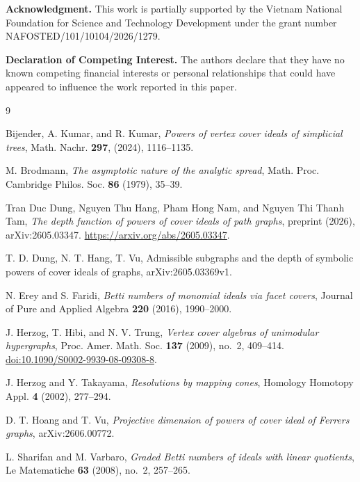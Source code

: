 \documentclass[12pt]{amsart}
\theoremstyle{definition}
\theoremstyle{remark}
\numberwithin{equation}{section}
\begin{document}
\noindent\textbf{Acknowledgment.} This work is partially supported by the Vietnam National Foundation for Science and Technology Development under the grant number NAFOSTED/101/10104/2026/1279.

\noindent\textbf{Declaration of Competing Interest.} The authors declare that they have no known competing financial interests or personal relationships that could have appeared to influence the work reported in this paper.

\begin{thebibliography}{9}

 Bijender, A. Kumar, and R. Kumar, {\it Powers of vertex cover ideals of simplicial trees}, Math. Nachr. {\bf 297}, (2024), 1116--1135.


 M. Brodmann, {\em The asymptotic nature of the analytic spread}, Math. Proc. Cambridge Philos. Soc. {\bf 86} (1979), 35--39.

Tran Duc Dung, Nguyen Thu Hang, Pham Hong Nam, and Nguyen Thi Thanh Tam,
\emph{The depth function of powers of cover ideals of path graphs},
preprint (2026), arXiv:2605.03347.
\url{https://arxiv.org/abs/2605.03347}.


 T. D. Dung, N. T. Hang, T. Vu, Admissible subgraphs and the depth of symbolic powers of cover ideals of graphs, arXiv:2605.03369v1.


N. Erey and S. Faridi,
\emph{Betti numbers of monomial ideals via facet covers}, Journal of Pure and Applied Algebra {\bf 220} (2016), 1990--2000.

J. Herzog, T. Hibi, and N. V. Trung,
\emph{Vertex cover algebras of unimodular hypergraphs},
Proc. Amer. Math. Soc. \textbf{137} (2009), no.~2, 409--414.
\href{https://doi.org/10.1090/S0002-9939-08-09308-8}
{doi:10.1090/S0002-9939-08-09308-8}.

 J. Herzog  and Y. Takayama, {\it Resolutions by mapping cones}, Homology Homotopy Appl. {\bf 4} (2002), 277--294.


 D. T. Hoang and T. Vu, {\em Projective dimension of powers of cover ideal of Ferrers graphs}, arXiv:2606.00772.

L. Sharifan and M. Varbaro,
\emph{Graded Betti numbers of ideals with linear quotients},
Le Matematiche \textbf{63} (2008), no.~2, 257--265.

\end{thebibliography}
\end{document}
